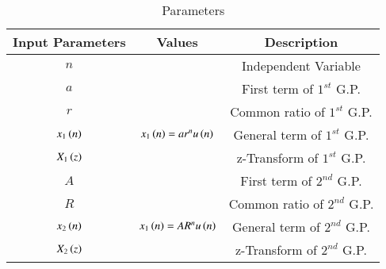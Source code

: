 \begin{table}[htbp]
    \centering
    \begin{tabular}{|c|c|c|} \hline
      \textbf{Input Parameters} & \textbf{Values} & \textbf{Description} \\ \hline
      $n$ & & Independent Variable \\ \hline
      $a$ & & First term of $1^{st}$ G.P. \\ \hline
      $r$ & & Common ratio of $1^{st}$ G.P. \\ \hline
      $x_1\left(n\right)$ & $x_1\left(n\right)=ar^nu\left(n\right)$& General term of $1^{st}$ G.P. \\ \hline
      $X_1\left(z\right)$ & & z-Transform of $1^{st}$ G.P. \\ \hline
      $A$ & & First term of $2^{nd}$ G.P. \\ \hline
      $R$ & & Common ratio of $2^{nd}$ G.P. \\ \hline
      $x_2\left(n\right)$ & $x_1\left(n\right)=AR^nu\left(n\right)$& General term of $2^{nd}$ G.P. \\ \hline
      $X_2\left(z\right)$ & & z-Transform of $2^{nd}$ G.P. \\ \hline
    \end{tabular}
    \vspace{3pt}
    \caption{Parameters}
    \label{tab:11.9.3.20.tab}
\end{table}
